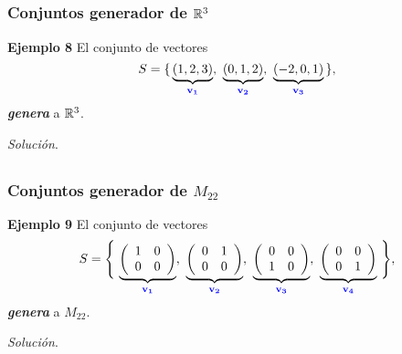 
\subsection{}

\begin{frame}\frametitle{Conjuntos generador de $\mathbb{R}^3$}

\begin{ej}{\textbf{Ejemplo 8}} \justifying
	El conjunto de vectores
	\[
		S = \{ \, \underbrace{(1,2,3)}_{\color{blue}\mathbf{v_1}}, \ \underbrace{(0,1,2)}_{\color{blue}\mathbf{v_2}}, \ 
		\underbrace{(-2,0,1)}_{\color{blue}\mathbf{v_3}} \, \},
	\]
	\textbf{\textit{genera}} a $\mathbb{R}^3$.
\end{ej}	

\textit{Solución}.

\end{frame}


\subsection{}

\begin{frame}\frametitle{Conjuntos generador de $M_{22}$}

\begin{ej}{\textbf{Ejemplo 9}} \justifying
	El conjunto de vectores
	\[
		S = \Bigg\{ \, \underbrace{ \left( \begin{array}{cc} 1 & 0 \\ 0 & 0 \end{array} \right) }_{\color{blue}\mathbf{v_1}}, \ \underbrace{  \left( \begin{array}{cc}	0 & 1 \\ 0 & 0 \end{array} \right) }_{\color{blue}\mathbf{v_2}}, \ 
		\underbrace{ \left( \begin{array}{rr}   0 & 0 \\ 1 & 0 \end{array} \right) }_{\color{blue}\mathbf{v_3}}, \ 
		\underbrace{ \left( \begin{array}{rr}   0 & 0 \\ 0 & 1 \end{array} \right) }_{\color{blue}\mathbf{v_4}} \, \Bigg\},
	\]
	\textbf{\textit{genera}} a $M_{22}$.
\end{ej}	

\textit{Solución}.

\end{frame}

